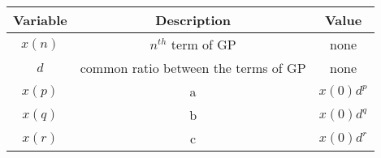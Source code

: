 \begin{tabular}{|c|c|c|} 
      \hline
\textbf{Variable}& \textbf{Description}& \textbf{Value}\\\hline
         $x(n)$& $n^{th}$ term of GP&none\\\hline
          $d$&common ratio between the terms of GP&none\\\hline
          $x(p)$& a &$x(0)d^p$ \\ \hline
          $x(q)$& b &$x(0)d^q$ \\ \hline
          $x(r)$& c &$x(0)d^r$ \\ \hline
    \end{tabular}
